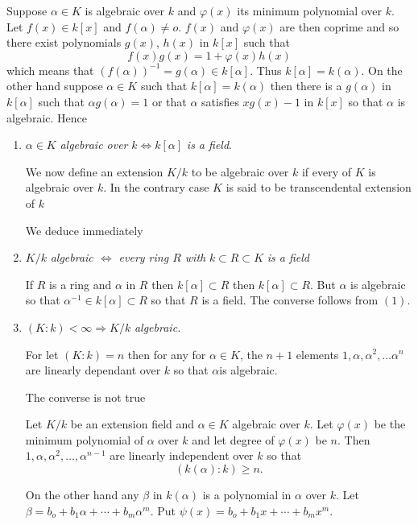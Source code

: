 Suppose $\alpha \in K$ is algebraic over $k$ and $\varphi (x)$ its
minimum polynomial over $k$. Let $f(x) \in k[x]$ and $f(\alpha) \neq
o$. $f(x)$ and $\varphi (x)$ are then coprime and so there exist
polynomials $g(x)$, $h(x)$ in $k[x]$ such that  
$$
f(x) g(x) =1 + \varphi (x) h(x)
$$
which means that $(f (\alpha))^{-1} = g(\alpha) \in k[\alpha]$. Thus
$k[\alpha] = k(\alpha)$. On the other hand suppose $\alpha \in K$ such
that $k[\alpha] = k(\alpha)$ then there is a $g(\alpha)$ in
$k[\alpha]$ such that $\alpha g(\alpha) =1$ or that $\alpha$ satisfies
$x g(x) -1$ in $k[x]$ so that $\alpha$ is algebraic. Hence 
\begin{enumerate}[1)]
\item  $\alpha \in K$ \textit{algebraic over} $k \Longleftrightarrow
  k[\alpha]$ \textit{is a field}. 

We now define an extension $K/k$ to be algebraic over $k$ if every of
$K$ is algebraic over $k$. In the contrary case $K$ is said to be
transcendental extension of $k$ 

We deduce immediately

\item $K/k$ \textit{algebraic $\Longleftrightarrow$ every ring $R$
  with} $k \subset R \subset K$ \textit{is a field} 

If $R$ is a ring and $\alpha$ in $R$ then $k[\alpha] \subset R$ then
$k[\alpha] \subset R$. But $\alpha $ is algebraic so that
$\alpha^{-1}\in k[\alpha] \subset R$ so that $R$ is a field. The
converse follows from $(1)$. 

\item $(K : k) < \infty \Longrightarrow K/k$ \textit{algebraic.} 

For let $(K : k) =n$ then for any for $\alpha \in K$, the $n+1$
elements $1, \alpha , \alpha^2 , \ldots \alpha^n$ are linearly
dependant over $k$ so that $\alpha$\pageoriginale is algebraic. 

The converse is not true

Let $K/k$ be an extension field and $\alpha \in K$ algebraic over
$k$. Let $\varphi (x)$ be the minimum polynomial of $\alpha$ over $k$
and let degree of $\varphi (x)$ be $n$. Then $1, \alpha, \alpha^2 ,
\ldots , \alpha^{n-1}$ are linearly independent over $k$ so that 
$$
(k (\alpha) : k ) \geq n.
$$

On the other hand any $\beta$ in $k (\alpha)$ is a polynomial in
$\alpha$ over $k$. Let $\beta = b_o + b_1 \alpha + \cdots + b_m
\alpha^m $. Put  $\psi (x) = b_o + b_1 x + \cdots + b_m x^m$. 


\end{enumerate}
